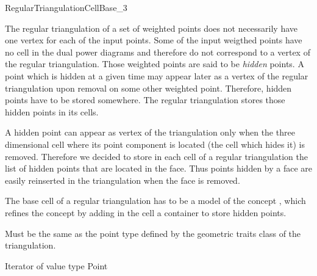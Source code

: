 

\begin{ccRefConcept}{RegularTriangulationCellBase_3}


\ccDefinition
  
The regular triangulation of a set of weighted points does not
necessarily
have one vertex for each of the input points. Some of the input
weigthed points have no cell in the dual power diagrams
and therefore do not correspond to a vertex of the regular
triangulation.
Those weighted points are said to be {\it hidden} points.
A  point which is hidden at a given time may appear later as a vertex of
the regular triangulation upon removal on some other weighted point.
Therefore, hidden points have to be stored somewhere.
The regular triangulation stores those hidden points
in its cells.

A hidden point can appear as vertex of the triangulation
only when the
three dimensional cell where its point component is located
(the cell which hides it)
is removed. Therefore we decided to store 
in each cell of a regular triangulation
the list of hidden points that are located in the face.
Thus  points hidden by a face are easily reinserted in the triangulation
when the face is removed.

The base cell of a regular triangulation 
has to be a model
of the concept \ccRefName, which refines
the concept  by adding
in the cell  a container to store hidden points.

\ccRefines
{}

\ccTypes
{}
{Must be the same as the point type 
defined by the geometric traits class of the triangulation.}

\ccTypes
{}
{Iterator of value type Point}





\end{ccRefConcept}
